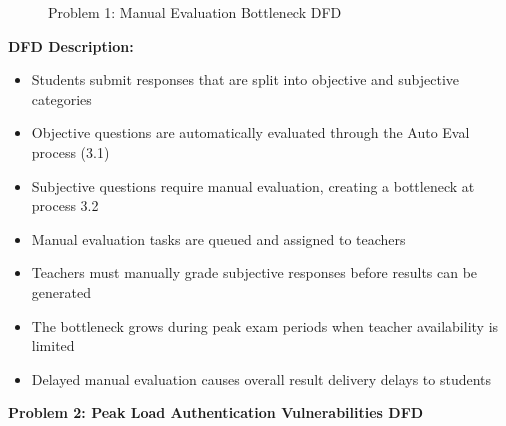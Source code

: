 \documentclass[12pt,a4paper,oneside]{book}
\begin{document}
\begin{figure}[H]
{
    }
    \caption{Problem 1: Manual Evaluation Bottleneck DFD}
\end{figure}

\textbf{DFD Description:} 
\begin{itemize}
    \item Students submit responses that are split into objective and subjective categories
    \item Objective questions are automatically evaluated through the Auto Eval process (3.1)
    \item Subjective questions require manual evaluation, creating a bottleneck at process 3.2
    \item Manual evaluation tasks are queued and assigned to teachers
    \item Teachers must manually grade subjective responses before results can be generated
    \item The bottleneck grows during peak exam periods when teacher availability is limited
    \item Delayed manual evaluation causes overall result delivery delays to students
\end{itemize}

\vspace{0.5cm}

\textbf{Problem 2: Peak Load Authentication Vulnerabilities DFD}
\end{document}
